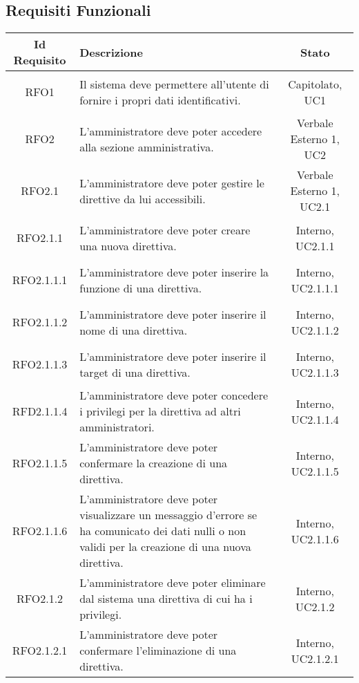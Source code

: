 \subsection{Requisiti Funzionali}
\normalsize
\begin{longtable}{|c|>{\centering}m{7cm}|c|}
\hline
\textbf{Id Requisito} & \textbf{Descrizione} & \textbf{Stato}\\
\hline
\endhead\hypertarget{RFO1}{RFO1} & Il sistema deve permettere all'utente di fornire i propri dati identificativi. & Capitolato, UC1\\ \hline
\hypertarget{RFO2}{RFO2} & L'amministratore deve poter accedere alla sezione amministrativa. & Verbale Esterno 1, UC2\\ \hline
\hypertarget{RFO2.1}{RFO2.1} & L'amministratore deve poter gestire le direttive da lui accessibili. & Verbale Esterno 1, UC2.1\\ \hline
\hypertarget{RFO2.1.1}{RFO2.1.1} & L'amministratore deve poter creare una nuova direttiva. & Interno, UC2.1.1\\ \hline
\hypertarget{RFO2.1.1.1}{RFO2.1.1.1} & L'amministratore deve poter inserire la funzione di una direttiva. & Interno, UC2.1.1.1\\ \hline
\hypertarget{RFO2.1.1.2}{RFO2.1.1.2} & L'amministratore deve poter inserire il nome di una direttiva. & Interno, UC2.1.1.2\\ \hline
\hypertarget{RFO2.1.1.3}{RFO2.1.1.3} & L'amministratore deve poter inserire il target di una direttiva. & Interno, UC2.1.1.3\\ \hline
\hypertarget{RFD2.1.1.4}{RFD2.1.1.4} & L'amministratore deve poter concedere i privilegi per la direttiva ad altri amministratori. & Interno, UC2.1.1.4\\ \hline
\hypertarget{RFO2.1.1.5}{RFO2.1.1.5} & L'amministratore deve poter confermare la creazione di una direttiva. & Interno, UC2.1.1.5\\ \hline
\hypertarget{RFO2.1.1.6}{RFO2.1.1.6} & L'amministratore deve poter visualizzare un messaggio d'errore se ha comunicato dei dati nulli o non validi per la creazione di una nuova direttiva. & Interno, UC2.1.1.6\\ \hline
\hypertarget{RFO2.1.2}{RFO2.1.2} & L'amministratore deve poter eliminare dal sistema una direttiva di cui ha i privilegi. & Interno, UC2.1.2\\ \hline
\hypertarget{RFO2.1.2.1}{RFO2.1.2.1} & L'amministratore deve poter confermare l'eliminazione di una direttiva. & Interno, UC2.1.2.1\\ \hline

\end{longtable}
